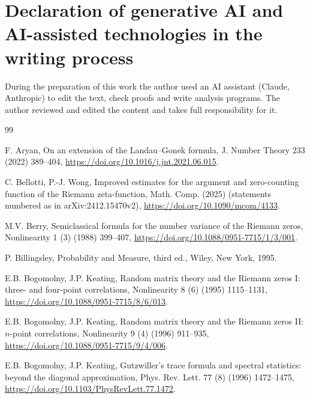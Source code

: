 \documentclass[preprint,12pt]{elsarticle}
\numberwithin{equation}{section}
\theoremstyle{plain}
\theoremstyle{definition}
\theoremstyle{remark}
\begin{document}
\section*{Declaration of generative AI and AI-assisted technologies in the writing process}
During the preparation of this work the author used an AI assistant (Claude, Anthropic) to edit the text, check proofs and write analysis programs. The author reviewed and edited the content and takes full responsibility for it.

\begin{thebibliography}{99}

F. Aryan, On an extension of the Landau--Gonek formula, J. Number Theory 233 (2022) 389--404, \href{https://doi.org/10.1016/j.jnt.2021.06.015}{https://doi.org/10.1016/j.jnt.2021.06.015}.

C. Bellotti, P.-J. Wong, Improved estimates for the argument and zero-counting function of the Riemann zeta-function, Math. Comp. (2025) (statements numbered as in arXiv:2412.15470v2), \href{https://doi.org/10.1090/mcom/4133}{https://doi.org/10.1090/mcom/4133}.

M.V. Berry, Semiclassical formula for the number variance of the Riemann zeros, Nonlinearity 1 (3) (1988) 399--407, \href{https://doi.org/10.1088/0951-7715/1/3/001}{https://doi.org/10.1088/0951-7715/1/3/001}.

P. Billingsley, Probability and Measure, third ed., Wiley, New York, 1995.

E.B. Bogomolny, J.P. Keating, Random matrix theory and the Riemann zeros I: three- and four-point correlations, Nonlinearity 8 (6) (1995) 1115--1131, \href{https://doi.org/10.1088/0951-7715/8/6/013}{https://doi.org/10.1088/0951-7715/8/6/013}.

E.B. Bogomolny, J.P. Keating, Random matrix theory and the Riemann zeros II: $n$-point correlations, Nonlinearity 9 (4) (1996) 911--935, \href{https://doi.org/10.1088/0951-7715/9/4/006}{https://doi.org/10.1088/0951-7715/9/4/006}.

E.B. Bogomolny, J.P. Keating, Gutzwiller's trace formula and spectral statistics: beyond the diagonal approximation, Phys. Rev. Lett. 77 (8) (1996) 1472--1475, \href{https://doi.org/10.1103/PhysRevLett.77.1472}{https://doi.org/10.1103/PhysRevLett.77.1472}.


\end{thebibliography}
\end{document}

